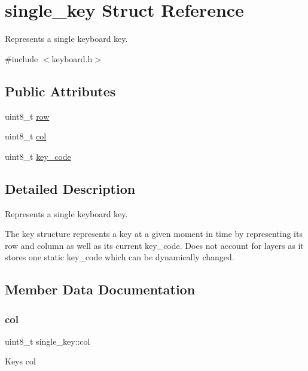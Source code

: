 \hypertarget{structsingle__key}{}\section{single\+\_\+key Struct Reference}
\label{structsingle__key}


Represents a single keyboard key.  




{\ttfamily \#include $<$keyboard.\+h$>$}

\subsection*{Public Attributes}
\begin{DoxyCompactItemize}
\item 
uint8\+\_\+t \hyperlink{structsingle__key_a86c0464140fe262bd1f0271a95885733}{row}
\item 
uint8\+\_\+t \hyperlink{structsingle__key_a246a23103a0616c1c92fee6c921d6cf6}{col}
\item 
uint8\+\_\+t \hyperlink{structsingle__key_ac1f4dc4c4e1eb4455cf143c9eac37f13}{key\+\_\+code}
\end{DoxyCompactItemize}


\subsection{Detailed Description}
Represents a single keyboard key. 

The key structure represents a key at a given moment in time by representing its row and column as well as its current key\+\_\+code. Does not account for layers as it stores one static key\+\_\+code which can be dynamically changed. 

\subsection{Member Data Documentation}
\mbox{\label{structsingle__key_a246a23103a0616c1c92fee6c921d6cf6}} 
\subsubsection{\texorpdfstring{col}{col}}
{\footnotesize\ttfamily uint8\+\_\+t single\+\_\+key\+::col}

Key\textquotesingle{}s col \mbox{\label{structsingle__key_ac1f4dc4c4e1eb4455cf143c9eac37f13}} 
